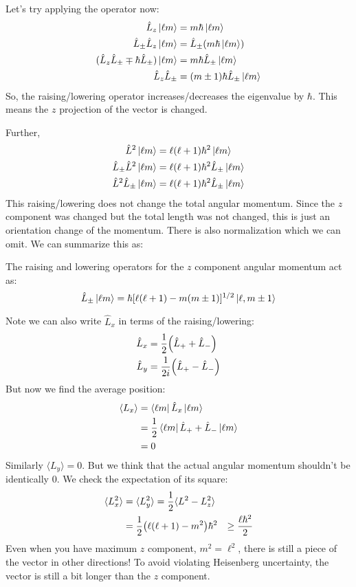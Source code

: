 Let's try applying the operator now:
\begin{align*}
    \hat{L}_z \ket{\ell m} &= m \hbar \ket{\ell m} \\
    \hat{L}_{\pm} \hat{L}_z \ket{\ell m} &= \hat{L}_{\pm}(m \hbar \ket{\ell m}) \\
    (\hat{L}_z \hat{L}_{\pm} \mp \hbar \hat{L}_{\pm}) \ket{\ell m} &= m \hbar \hat{L}_{\pm} \ket{\ell m} \\
    \hat{L}_z \hat{L}_{\pm} &= (m \pm 1) \hbar \hat{L}_{\pm} \ket{\ell m}
\end{align*}
So, the raising/lowering operator increases/decreases the eigenvalue by $\hbar$. This means the $z$ projection of the vector is changed.

Further,
\begin{align*}
    \hat{L}^2 \ket{\ell m} &= \ell (\ell + 1)\hbar^2 \ket{\ell m} \\
    \hat{L}_{\pm} \hat{L}^2 \ket{\ell m} &= \ell (\ell + 1) \hbar^2 \hat{L}_{\pm} \ket{\ell m} \\
    \hat{L}^2 \hat{L}_{\pm} \ket{\ell m} &= \ell (\ell + 1) \hbar^2 \hat{L}_{\pm} \ket{\ell m}
\end{align*}
This raising/lowering does not change the total angular momentum. Since the $z$ component was changed but the total length was not changed, this is just
an orientation change of the momentum. There is also normalization which we can omit. We can summarize this as:
\begin{theorem}
    The raising and lowering operators for the $z$ component angular momentum act as:
    \[ \hat{L}_{\pm} \ket{\ell m} = \hbar [\ell(\ell + 1) - m (m \pm 1)]^{1/2} \ket{\ell, m \pm 1}\]
\end{theorem}
Note we can also write $\hat{L}_x$ in terms of the raising/lowering:
\begin{align*}
    \hat{L}_x &= \frac{1}{2} \qty(\hat{L}_+ + \hat{L}_-) \\
    \hat{L}_y &= \frac{1}{2i} \qty(\hat{L}_+ - \hat{L}_-)
\end{align*}
But now we find the average position:
\begin{align*}
    \langle L_x \rangle &= \bra{\ell m} \hat{L}_x \ket{\ell m} \\
    &= \frac{1}{2} \bra{\ell m} \hat{L}_+ + \hat{L}_- \ket{\ell m} \\
    &= 0
\end{align*}
Similarly $\langle L_y \rangle = 0$. But we think that the actual angular momentum shouldn't be identically 0.
We check the expectation of its square:
\begin{align*}
    \langle L_x^2 \rangle &= \langle L_y^2 \rangle = \frac{1}{2} \langle L^2 - L_z^2 \rangle \\
    &= \frac{1}{2} \qty(\ell (\ell + 1) - m^2) \hbar^2
    &\geq \frac{\ell \hbar^2}{2}
\end{align*}
Even when you have maximum $z$ component, $m^2 = \ell^2$, there is still a piece of the vector in other directions!
To avoid violating Heisenberg uncertainty, the vector is still a bit longer than the $z$ component.

